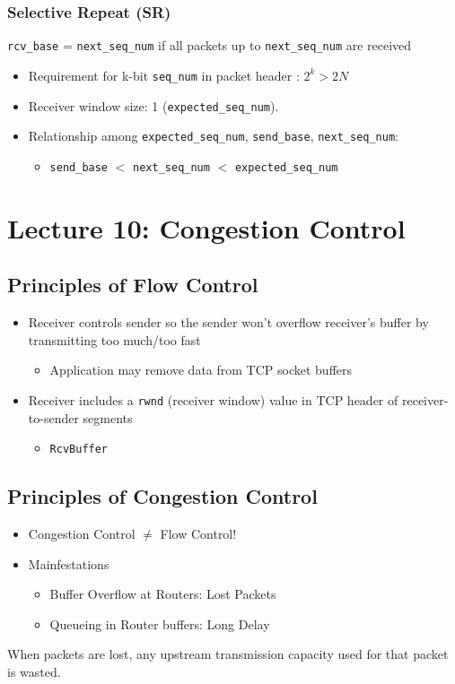 \documentclass[a4paper]{article}
\begin{document}
\subsubsection{Selective Repeat (SR)}
\texttt{rcv\_base} = \texttt{next\_seq\_num} if all packets up to \texttt{next\_seq\_num} are received

\begin{itemize}
    \item Requirement for k-bit \texttt{seq\_num} in packet header : $2^k > 2N$
    \item Receiver window size: 1 (\texttt{expected\_seq\_num}).
    \item Relationship among \texttt{expected\_seq\_num}, \texttt{send\_base}, \texttt{next\_seq\_num}:
    \begin{itemize}[label=$\circ$]
    \item \texttt{send\_base} $<$ \texttt{next\_seq\_num} $<$ \texttt{expected\_seq\_num}
    \end{itemize}
\end{itemize}

\newpage
\section{Lecture 10: Congestion Control}
\subsection{Principles of Flow Control}
\begin{itemize}
    \item Receiver controls sender so the sender won't overflow receiver's buffer by transmitting too much/too fast
    \begin{itemize}[label=$\circ$]
        \item Application may remove data from TCP socket buffers
    \end{itemize}
    \item Receiver includes a \texttt{rwnd} (receiver window) value in TCP header of receiver-to-sender segments
    \begin{itemize}[label=$\circ$]
        \item \texttt{RcvBuffer}
    \end{itemize}
\end{itemize}

\subsection{Principles of Congestion Control}
\begin{itemize}
    \item Congestion Control $\neq$ Flow Control!
    \item Mainfestations
    \begin{itemize}[label=$\circ$]
        \item Buffer Overflow at Routers: Lost Packets
        \item Queueing in Router buffers: Long Delay
    \end{itemize}
\end{itemize}
\noindent When packets are lost, any upstream transmission capacity used for that packet is wasted.
\end{document}
